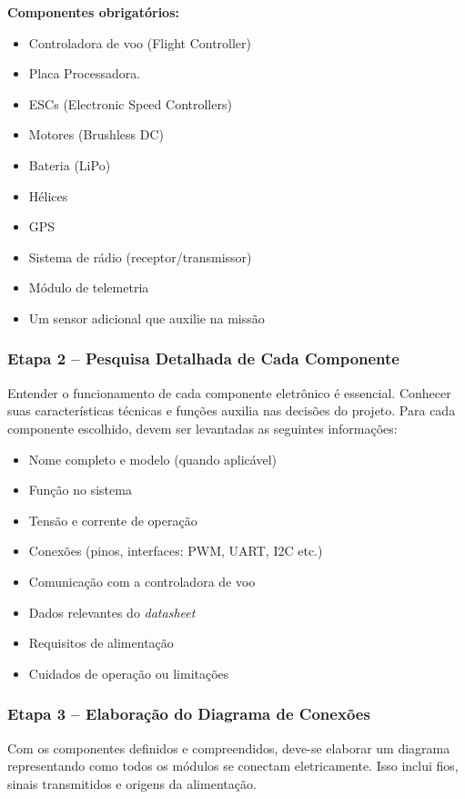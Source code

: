 \textbf{Componentes obrigatórios:}
\begin{itemize}
    \item Controladora de voo (Flight Controller)
    \item {\color{red} Placa Processadora.}
    \item ESCs (Electronic Speed Controllers)
    \item Motores (Brushless DC)
    \item Bateria (LiPo)
    \item Hélices
    \item GPS
    \item Sistema de rádio (receptor/transmissor)
    \item Módulo de telemetria
    \item Um sensor adicional que auxilie na missão
\end{itemize}

\subsubsection*{Etapa 2 – Pesquisa Detalhada de Cada Componente}

Entender o funcionamento de cada componente eletrônico é essencial. Conhecer suas características técnicas e funções auxilia nas decisões do projeto. Para cada componente escolhido, devem ser levantadas as seguintes informações:

\begin{itemize}
    \item Nome completo e modelo (quando aplicável)
    \item Função no sistema
    \item Tensão e corrente de operação
    \item Conexões (pinos, interfaces: PWM, UART, I2C etc.)
    \item Comunicação com a controladora de voo
    \item Dados relevantes do \textit{datasheet}
    \item Requisitos de alimentação
    \item Cuidados de operação ou limitações
\end{itemize}

\subsubsection*{Etapa 3 – Elaboração do Diagrama de Conexões}

Com os componentes definidos e compreendidos, deve-se elaborar um diagrama representando como todos os módulos se conectam eletricamente. Isso inclui fios, sinais transmitidos e origens da alimentação.

